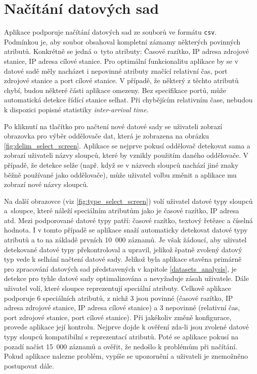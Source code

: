 \section{Načítání datových sad}
\label{dataset_loading}

Aplikace podporuje načítání datových sad ze souborů ve formátu \texttt{csv}. Podmínkou je, aby soubor obsahoval kompletní záznamy některých povinných atributů. Konkrétně se jedná o~tyto atributy: Časové razítko, IP adresa zdrojové stanice, IP adresa cílové stanice. Pro optimální funkcionalitu aplikace by se v datové sadě měly nacházet i nepovinné atributy značící relativní čas, port zdrojové stanice a port cílové stanice. V případě, že některý z těchto atributů chybí, budou některé části aplikace omezeny. Bez specifikace portů, může automatická detekce řídící stanice selhat. Při chybějícím relativním čase, nebudou k dispozici popisné statistiky \emph{inter-arrival time}.

Po kliknutí na tlačítko pro načtení nové datové sady se uživateli zobrazí obrazovka pro výběr oddělovače dat, která je zobrazena na obrázku \ref{fig:delim_select_screen}. Aplikace se nejprve pokusí oddělovač detekovat sama a zobrazí uživateli názvy sloupců, které by vznikly použitím daného oddělovače. V případě, že detekce selže (např. když se v názvech sloupců nachází jiné znaky běžně používané jako oddělovače), může uživatel volbu změnit a aplikace mu zobrazí nové názvy sloupců.

Na další obrazovce (viz \ref{fig:type_select_screen}) volí uživatel datové typy sloupců a~sloupce, které náleží speciálním atributům jako je časové razítko, IP adresa atd. Mezi podporované datové typy patří: časové razítko, textový řetězec a číselná hodnota. I v tomto případě se aplikace snaží automaticky detekovat datové typy atributů a to na základě prvních 10~000 záznamů. Je však žádoucí, aby uživatel detekované datové typy překontroloval a upravil, jelikož špatně zvolený datový typ vede k selhání načtení datové sady. Jelikož byla aplikace stavěna primárně pro zpracování datových sad představených v kapitole \ref{datasets_analysis}, je detekce pro tyhle datové sady optimalizována a nevyžaduje zásah uživatele. Dále uživatel volí, které sloupce reprezentují speciální atributy. Celkově aplikace podporuje 6 speciálních atributů, z nichž 3 jsou povinné (časové razítko, IP adresa zdrojové stanice, IP adresa cílové stanice) a 3 nepovinné (relativní čas, port zdrojové stanice, port cílové stanice). 
Při jakékoliv změně konfigurace, provede aplikace její kontrolu. Nejprve dojde k ověření zda-li jsou zvolené datové typy sloupců kompatibilní s reprezentací atributů. Poté se aplikace pokusí na pozadí načíst 15~000 záznamů a ověřit, že nedošlo k problémům při načítání. Pokud aplikace nalezne problém, vypíše se upozornění a uživateli je znemožněno postupovat dále.







